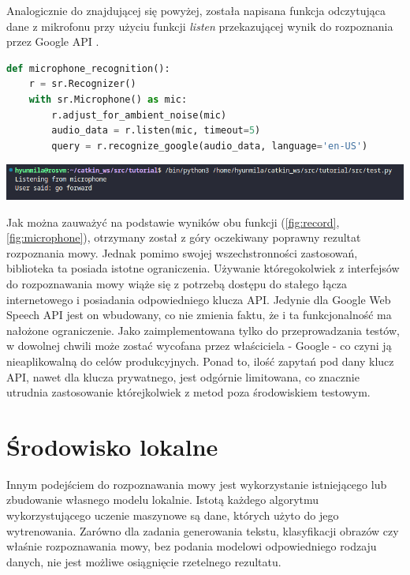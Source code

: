 Analogicznie do znajdującej się powyżej, została napisana funkcja odczytująca dane z mikrofonu przy użyciu funkcji \textit{listen} przekazującej wynik do rozpoznania przez Google API \cite{webspeech}.

\begin{lstlisting}[language=Python]
def microphone_recognition():
    r = sr.Recognizer()
    with sr.Microphone() as mic:
        r.adjust_for_ambient_noise(mic)
        audio_data = r.listen(mic, timeout=5)
        query = r.recognize_google(audio_data, language='en-US')
\end{lstlisting}

\begin{center}
    \includegraphics[width=0.95\linewidth]{files/microphon1.png}
    \label{fig:microphone}
\end{center}

Jak można zauważyć na podstawie wyników obu funkcji (\ref{fig:record}, \ref{fig:microphone}), otrzymany został z góry oczekiwany poprawny rezultat rozpoznania mowy. Jednak pomimo swojej wszechstronności zastosowań, biblioteka ta posiada istotne ograniczenia. Używanie któregokolwiek z interfejsów do rozpoznawania mowy wiąże się z potrzebą dostępu do stałego łącza internetowego i posiadania odpowiedniego klucza API. Jedynie dla Google Web Speech API jest on wbudowany, co nie zmienia faktu, że i ta funkcjonalność ma nałożone ograniczenie. Jako zaimplementowana tylko do przeprowadzania testów, w dowolnej chwili może zostać wycofana przez właściciela - Google - co czyni ją nieaplikowalną do celów produkcyjnych. Ponad to, ilość zapytań pod dany klucz API, nawet dla klucza prywatnego, jest odgórnie limitowana, co znacznie utrudnia zastosowanie którejkolwiek z metod poza środowiskiem testowym.


\section{Środowisko lokalne}
\label{sec:srodLocal}

Innym podejściem do rozpoznawania mowy jest wykorzystanie istniejącego lub zbudowanie własnego modelu lokalnie. Istotą każdego algorytmu wykorzystującego uczenie maszynowe są dane, których użyto do jego wytrenowania. Zarówno dla zadania generowania tekstu, klasyfikacji obrazów czy właśnie rozpoznawania mowy, bez podania modelowi odpowiedniego rodzaju danych, nie jest możliwe osiągnięcie rzetelnego rezultatu. 

